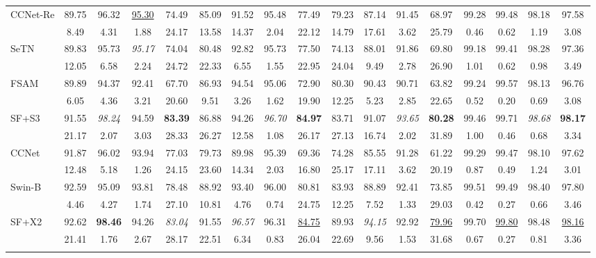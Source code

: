\documentclass[preprint,12pt]{elsarticle}
\begin{document}
\begin{table}[!htbp]
\begin{tabular}{lcccccccccccccccc}
CCNet-Re & 89.75 & 96.32 & \uline{95.30} & 74.49 & 85.09 & 91.52 & 95.48 & 77.49 & 79.23 & 87.14 & 91.45 & 68.97 & 99.28 & 99.48 & 98.18 & 97.58 \\
  & 8.49 & 4.31 & 1.88 & 24.17 & 13.58 & 14.37 & 2.04 & 22.12 & 14.79 & 17.61 & 3.62 & 25.79 & 0.46 & 0.62 & 1.19 & 3.08 \\ \addlinespace[3pt]
SeTN & 89.83 & 95.73 & \textit{95.17} & 74.04 & 80.48 & 92.82 & 95.73 & 77.50 & 74.13 & 88.01 & 91.86 & 69.80 & 99.18 & 99.41 & 98.28 & 97.36 \\
  & 12.05 & 6.58 & 2.24 & 24.72 & 22.33 & 6.55 & 1.55 & 22.95 & 24.04 & 9.49 & 2.78 & 26.90 & 1.01 & 0.62 & 0.98 & 3.49 \\ \addlinespace[3pt]
\rowcolor{gray!12}
FSAM & 89.89 & 94.37 & 92.41 & 67.70 & 86.93 & 94.54 & 95.06 & 72.90 & 80.30 & 90.43 & 90.71 & 63.82 & 99.24 & 99.57 & 98.13 & 96.76 \\
  & 6.05 & 4.36 & 3.21 & 20.60 & 9.51 & 3.26 & 1.62 & 19.90 & 12.25 & 5.23 & 2.85 & 22.65 & 0.52 & 0.20 & 0.69 & 3.08 \\ \addlinespace[3pt]
SF+S3 & 91.55 & \textit{98.24} & 94.59 & \textbf{83.39} & 86.88 & 94.26 & \textit{96.70} & \textbf{84.97} & 83.71 & 91.07 & \textit{93.65} & \textbf{80.28} & 99.46 & 99.71 & \textit{98.68} & \textbf{98.17} \\
  & 21.17 & 2.07 & 3.03 & 28.33 & 26.27 & 12.58 & 1.08 & 26.17 & 27.13 & 16.74 & 2.02 & 31.89 & 1.00 & 0.46 & 0.68 & 3.34 \\ \addlinespace[3pt]
\rowcolor{gray!12}
CCNet & 91.87 & 96.02 & 93.94 & 77.03 & 79.73 & 89.98 & 95.39 & 69.36 & 74.28 & 85.55 & 91.28 & 61.22 & 99.29 & 99.47 & 98.10 & 97.62 \\
  & 12.48 & 5.18 & 1.26 & 24.15 & 23.60 & 14.34 & 2.03 & 16.80 & 25.17 & 17.11 & 3.62 & 20.19 & 0.87 & 0.49 & 1.24 & 3.01 \\ \addlinespace[3pt]
Swin-B & 92.59 & 95.09 & 93.81 & 78.48 & 88.92 & 93.40 & 96.00 & 80.81 & 83.93 & 88.89 & 92.41 & 73.85 & 99.51 & 99.49 & 98.40 & 97.80 \\
  & 4.46 & 4.27 & 1.74 & 27.10 & 10.81 & 4.76 & 0.74 & 24.75 & 12.25 & 7.52 & 1.33 & 29.03 & 0.42 & 0.27 & 0.66 & 3.46 \\ \addlinespace[3pt]
\rowcolor{gray!12}
SF+X2 & 92.62 & \textbf{98.46} & 94.26 & \textit{83.04} & 91.55 & \textit{96.57} & 96.31 & \uline{84.75} & 89.93 & \textit{94.15} & 92.92 & \uline{79.96} & 99.70 & \uline{99.80} & 98.48 & \uline{98.16} \\
  & 21.41 & 1.76 & 2.67 & 28.17 & 22.51 & 6.34 & 0.83 & 26.04 & 22.69 & 9.56 & 1.53 & 31.68 & 0.67 & 0.27 & 0.81 & 3.36 \\ \addlinespace[3pt]

\end{tabular}
\end{table}
\end{document}
